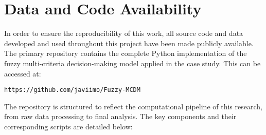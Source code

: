 \chapter*{Data and Code Availability}


In order to ensure the reproducibility of this work, all source code and data developed and used throughout this project have been made publicly available. The primary repository contains the complete Python implementation of the fuzzy multi-criteria decision-making model applied in the case study. This can be accessed at:
\begin{center}
    \texttt{https://github.com/javiimo/Fuzzy-MCDM}
\end{center}

The repository is structured to reflect the computational pipeline of this research, from raw data processing to final analysis. The key components and their corresponding scripts are detailed below:

